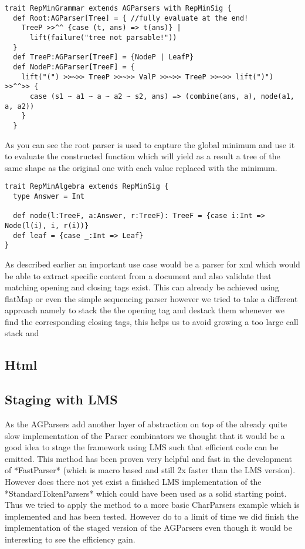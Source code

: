 \begin{lstlisting}
trait RepMinGrammar extends AGParsers with RepMinSig {
  def Root:AGParser[Tree] = { //fully evaluate at the end!
    TreeP >>^^ {case (t, ans) => t(ans)} |
      lift(failure("tree not parsable!"))
  }
  def TreeP:AGParser[TreeF] = {NodeP | LeafP}
  def NodeP:AGParser[TreeF] = {
    lift("(") >>~>> TreeP >>~>> ValP >>~>> TreeP >>~>> lift(")") >>^^>> {
      case (s1 ~ a1 ~ a ~ a2 ~ s2, ans) => (combine(ans, a), node(a1, a, a2))
    }
  }
\end{lstlisting}
As you can see the root parser is used to capture the global minimum and use it to evaluate the constructed function which will yield as a result a tree of the same shape as the original one with each value replaced with the minimum.

\begin{lstlisting}
trait RepMinAlgebra extends RepMinSig {
  type Answer = Int

  def node(l:TreeF, a:Answer, r:TreeF): TreeF = {case i:Int => Node(l(i), i, r(i))}
  def leaf = {case _:Int => Leaf}
}
\end{lstlisting}

As described earlier an important use case would be a parser for xml which would be able to extract specific content from a document and also validate that matching opening and closing tags exist. This can already be achieved using flatMap or even the simple sequencing parser however we tried to take a different approach namely to stack the the opening tag and destack them whenever we find the corresponding closing tags, this helps us to avoid growing a too large call stack and 
\subsection{Html}


\subsection{Staging with LMS}
As the AGParsers add another layer of abstraction on top of the already quite slow implementation of the Parser combinators we thought that it would be a good idea to stage the framework using LMS such that efficient code can be emitted. This method has been proven very helpful and fast in the development of *FastParser* (which is macro based and still 2x faster than the LMS version).
However does there not yet exist a finished LMS implementation of the *StandardTokenParsers* which could have been used as a solid starting point. Thus we tried to apply the method to a more basic CharParsers example which is implemented and has been tested.
However do to a limit of time we did finish the implementation of the staged version of the AGParsers even though it would be interesting to see the efficiency gain.

